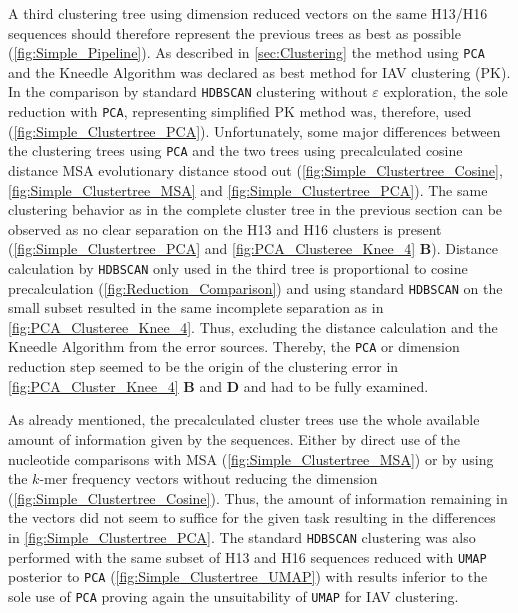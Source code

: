 A third clustering tree using dimension reduced vectors on the same H13/H16 sequences should therefore represent the previous trees as best as possible (\autoref{fig:Simple_Pipeline}). As described in \autoref{sec:Clustering} the method using \texttt{PCA} and the Kneedle Algorithm was declared as best method for \gls{IAV} clustering (PK). In the comparison by standard \texttt{HDBSCAN} clustering without $\varepsilon$ exploration, the sole reduction with \texttt{PCA}, representing simplified PK method was, therefore, used (\autoref{fig:Simple_Clustertree_PCA}). Unfortunately, some major differences between the clustering trees using \texttt{PCA} and the two trees using precalculated cosine distance \gls{MSA} evolutionary distance stood out (\autoref{fig:Simple_Clustertree_Cosine}, \autoref{fig:Simple_Clustertree_MSA} and \autoref{fig:Simple_Clustertree_PCA}). The same clustering behavior as in the complete cluster tree in the previous section can be observed as no clear separation on the H13 and H16 clusters is present (\autoref{fig:Simple_Clustertree_PCA} and \autoref{fig:PCA_Clusteree_Knee_4} \textbf{\textsf{B}}). Distance calculation by \texttt{HDBSCAN} only used in the third tree is proportional to cosine precalculation (\autoref{fig:Reduction_Comparison}) and using standard \texttt{HDBSCAN} on the small subset resulted in the same incomplete separation as in \autoref{fig:PCA_Clusteree_Knee_4}. Thus, excluding the distance calculation and the Kneedle Algorithm from the error sources. Thereby, the \texttt{PCA} or dimension reduction step seemed to be the origin of the clustering error in \autoref{fig:PCA_Cluster_Knee_4} \textbf{\textsf{B}} and \textbf{\textsf{D}} and had to be fully examined.

\vspace{1em}

As already mentioned, the precalculated cluster trees use the whole available amount of information given by the sequences. Either by direct use of the nucleotide comparisons with \gls{MSA} (\autoref{fig:Simple_Clustertree_MSA}) or by using the $k$-mer frequency vectors without reducing the dimension (\autoref{fig:Simple_Clustertree_Cosine}). Thus, the amount of information remaining in the vectors did not seem to suffice for the given task resulting in the differences in \autoref{fig:Simple_Clustertree_PCA}. The standard \texttt{HDBSCAN} clustering was also performed with the same subset of H13 and H16 sequences reduced with \texttt{UMAP} posterior to \texttt{PCA} (\autoref{fig:Simple_Clustertree_UMAP}) with results inferior to the sole use of \texttt{PCA} proving again the unsuitability of \texttt{UMAP} for \gls{IAV} clustering.%